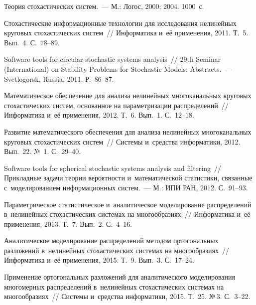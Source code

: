 \begin{multicols}{2}
{{\begin{thebibliography}{99}
Теория стохастических систем.~--- М.: Логос, 2000; 2004. 1000~с.


Стохастические информационные технологии для исследования нелинейных круговых 
стохастических систем~// Информатика и~её применения, 2011. Т.~5. Вып.~4. С.~78--89.

Software tools for circular stochastic systems analysis~// 
29th  Seminar (International) on Stability Problems for Stochastic Models: Abstracts.~--- 
Svetlogorsk, Russia, 2011. Р.~86--87.


 Математическое обеспечение для анализа 
нелинейных многоканальных круговых стохастических систем, основанное на 
параметризации распределений~// Информатика и~её применения, 2012. Т.~6. 
Вып.~1. С.~12--18.

Развитие математического обеспечения для анализа нелинейных многоканальных круговых 
стохастических сис\-тем~// Системы и~средства информатики, 2012. Вып.~22. №~1. С.~29--40.

Software tools for spherical stochastic systems analysis and filtering~//  
Прикладные задачи теории веро\-ят\-ности и~математической статистики, связанные 
с~моделированием информационных систем.~--- М.: ИПИ РАН, 2012. С.~91--93.

Параметрическое статистическое и~аналитическое моделирование распределений 
в~нелинейных стохастических системах на многообразиях~// Информатика и~её применения, 2013. Т.~7. Вып.~2. С.~4--16.


Аналитическое моделирование распределений методом ортогональных разложений 
в~нелинейных стохастических системах на многообразиях~// Информатика и~её 
применения, 2015. Т.~9. Вып.~3. С.~17--24.

Применение ортогональных разложений для аналитического моделирования многомерных 
распределений в~нелинейных стохастических системах на многообразиях~// Системы 
и~средства информатики, 2015. Т.~25. №\,3. С.~3--22.


\end{thebibliography}}}
\end{multicols}
